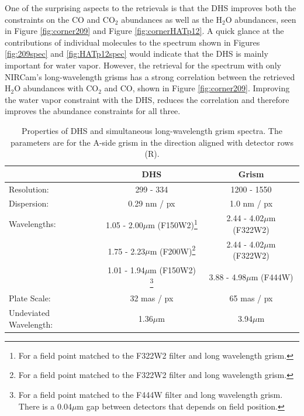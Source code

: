 \documentclass[iop]{emulateapj}
\newcommand{\DHSres}{299 - 334}
\newcommand{\DHSgap}{0.04}
\begin{document}

One of the surprising aspects to the retrievals is that the DHS improves both the constraints on the CO and CO$_2$ abundances as well as the H$_2$O abundances, seen in Figure \ref{fig:corner209} and Figure \ref{fig:cornerHATp12}. 
A quick glance at the contributions of individual molecules to the spectrum shown in Figures \ref{fig:209spec} and \ref{fig:HATp12spec} would indicate that the DHS is mainly important for water vapor.
However, the retrieval for the spectrum with only NIRCam's long-wavelength grisms has a strong correlation between the retrieved H$_2$O abundances with CO$_2$ and CO, shown in Figure \ref{fig:corner209}.
Improving the water vapor constraint with the DHS, reduces the correlation and therefore improves the abundance constraints for all three.

\begin{table}[!t]
\centering
\begin{tabular}{lcc}
\hline \hline
 & DHS & Grism \\
\hline \hline		
Resolution: &  \DHSres & 1200 - 1550 \\
Dispersion: & 0.29 nm / px & 1.0 nm / px \\
Wavelengths: & 1.05 - 2.00$\mu$m (F150W2)\footnote{For a field point matched to the F322W2 filter and long wavelength grism.} & 2.44 - 4.02$\mu$m (F322W2)\\
			 & 1.75 - 2.23$\mu$m (F200W)\footnote{For a field point matched to the F322W2 filter and long wavelength grism.} & 2.44 - 4.02$\mu$m (F322W2)\\
			& 	1.01 - 1.94$\mu$m (F150W2) \footnote{For a field point matched to the F444W filter and long wavelength grism. There is a \DHSgap$\mu$m gap between detectors that depends on field position.}		& 3.88 - 4.98$\mu$m (F444W) \\
Plate Scale: & 32 mas / px  &  65 mas / px\\
Undeviated Wavelength: & 1.36$\mu$m & 3.94$\mu$m   \\
\hline
\end{tabular}
\caption{Properties of DHS and simultaneous long-wavelength grism spectra. The parameters are for the A-side grism in the direction aligned with detector rows (R).}\label{tab:DHSgprop}
\vspace{0.1in}
\end{table}
\end{document}

